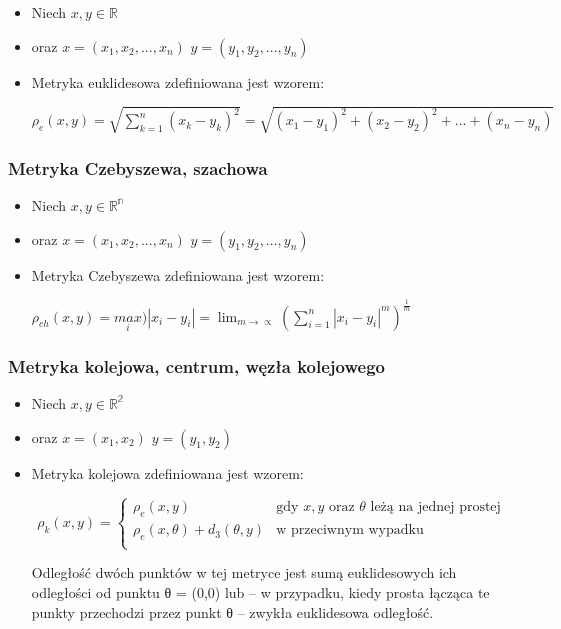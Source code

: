 \documentclass[runningheads]{llncs}
\begin{document}
\begin{itemize}
\item  Niech  $ x,y \in  \mathbb{R} $
\item  oraz   $ x = (x_{1},x_{2},..., x_{n}) $  
\vspace{1mm} $ y = (y_{1},y_{2},..., y_{n}) $ 
\item  Metryka euklidesowa zdefiniowana jest wzorem:

\vspace{5mm} $\rho_{e}(x,y) = \sqrt{ \sum_{k=1}^{n}(x_{k} - y_{k})^{2}} =\sqrt{(x_1 - y_1)^{2} + (x_2 - y_2)^{2} + ... + (x_n - y_n)}$
\end{itemize}


\subsubsection{Metryka Czebyszewa, szachowa} 

\begin{itemize}
\item  Niech  $ x,y \in  \mathbb{R^{n}} $
\item  oraz   $ x = (x_{1},x_{2},..., x_{n}) $  
\vspace{1mm} $ y = (y_{1},y_{2},..., y_{n}) $ 
\item  Metryka Czebyszewa zdefiniowana jest wzorem:

\vspace{5mm} $\rho_{ch}(x,y) = \underset{i}{max})\left | x_{i} - y_{i} \right | = \lim_{m\rightarrow \propto } \left ( \sum_{i=1}^{n} \left |x_i - y_i  \right |^{m} \right )^{\frac{1}{m}}$
\end{itemize}


\subsubsection{Metryka kolejowa, centrum, węzła
kolejowego} 

\begin{itemize}
\item  Niech  $ x,y \in  \mathbb{R^{2}} $
\item  oraz   $ x = (x_{1},x_{2}) $  
\vspace{1mm} $ y = (y_{1},y_{2}) $ 
\item Metryka kolejowa zdefiniowana jest wzorem:


$$
\rho_k(x,y) = \left\{ \begin{array}{lr}
\rho_e (x,y) &  \textrm{gdy $x,y$  oraz $\theta$ leżą na jednej prostej}\\
\rho_e(x,\theta ) + d_3 (\theta,y) &  \textrm{w przeciwnym wypadku}\\
\end{array} \right.
$$


\vspace{5mm} 
Odległość dwóch punktów w tej metryce jest sumą euklidesowych
ich odległości od punktu θ = (0,0) lub – w przypadku, kiedy prosta
łącząca te punkty przechodzi przez punkt θ – zwykła euklidesowa
odległość. 
\end{itemize}
\end{document}
